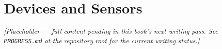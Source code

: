 \chapter{Devices and Sensors}
\label{ch:devices-sensors}

\emph{[Placeholder --- full content pending in this book's next writing pass. See \texttt{PROGRESS.md} at the repository root for the current writing status.]}
